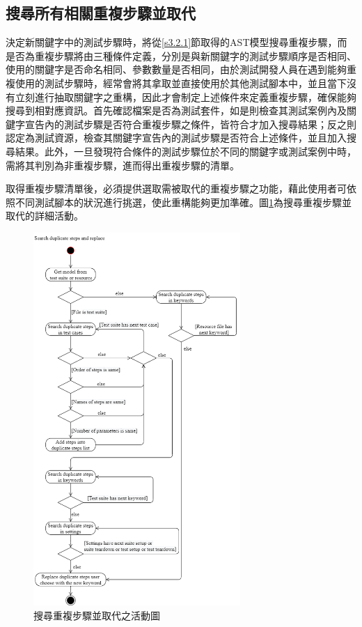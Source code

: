 \subsection{搜尋所有相關重複步驟並取代}\label{s3.2.3}
\indent
決定新關鍵字中的測試步驟時，將從\ref{s3.2.1}節取得的AST模型搜尋重複步驟，而是否為重複步驟將由三種條件定義，分別是與新關鍵字的測試步驟順序是否相同、使用的關鍵字是否命名相同、參數數量是否相同，由於測試開發人員在遇到能夠重複使用的測試步驟時，經常會將其拿取並直接使用於其他測試腳本中，並且當下沒有立刻進行抽取關鍵字之重構，因此才會制定上述條件來定義重複步驟，確保能夠搜尋到相對應資訊。首先確認檔案是否為測試套件，如是則檢查其測試案例內及關鍵字宣告內的測試步驟是否符合重複步驟之條件，皆符合才加入搜尋結果；反之則認定為測試資源，檢查其關鍵字宣告內的測試步驟是否符合上述條件，並且加入搜尋結果。此外，一旦發現符合條件的測試步驟位於不同的關鍵字或測試案例中時，需將其判別為非重複步驟，進而得出重複步驟的清單。

\indent
取得重複步驟清單後，必須提供選取需被取代的重複步驟之功能，藉此使用者可依照不同測試腳本的狀況進行挑選，使此重構能夠更加準確。圖\ref{f3.4}為搜尋重複步驟並取代的詳細活動。

\begin{figure}[H]
    \centering
    \includegraphics[width=0.7\textwidth]{picture/Search_duplicate_steps_and_replace.png}
    \caption{搜尋重複步驟並取代之活動圖}
    \label{f3.4}
\end{figure}

